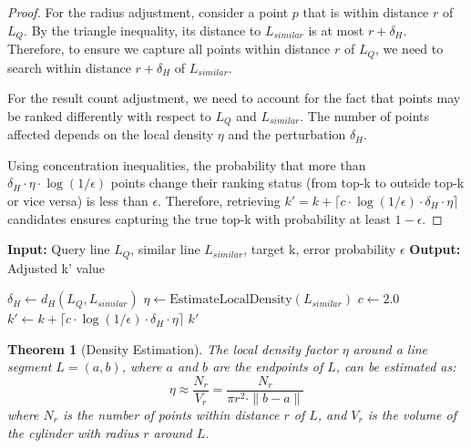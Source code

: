 \documentclass[numbers,sort]{article}
\newtheorem{theorem}{Theorem}
\begin{document}
\begin{proof}
For the radius adjustment, consider a point $p$ that is within distance $r$ of $L_Q$. By the triangle inequality, its distance to $L_{similar}$ is at most $r + \delta_H$. Therefore, to ensure we capture all points within distance $r$ of $L_Q$, we need to search within distance $r + \delta_H$ of $L_{similar}$.

For the result count adjustment, we need to account for the fact that points may be ranked differently with respect to $L_Q$ and $L_{similar}$. The number of points affected depends on the local density $\eta$ and the perturbation $\delta_H$.

Using concentration inequalities, the probability that more than $\delta_H \cdot \eta \cdot \log(1/\epsilon)$ points change their ranking status (from top-k to outside top-k or vice versa) is less than $\epsilon$. Therefore, retrieving $k' = k + \lceil c \cdot \log(1/\epsilon) \cdot \delta_H \cdot \eta \rceil$ candidates ensures capturing the true top-k with probability at least $1-\epsilon$.
\end{proof}

\begin{algorithm}[h]
\caption{Adaptive k' Selection}
\label{alg:adaptive-k}
\begin{algorithmic}[1]
\STATE \textbf{Input:} Query line $L_Q$, similar line $L_{similar}$, target k, error probability $\epsilon$
\STATE \textbf{Output:} Adjusted k' value

\STATE $\delta_H \leftarrow d_H(L_Q, L_{similar})$ 
\STATE $\eta \leftarrow \text{EstimateLocalDensity}(L_{similar})$ 
\STATE $c \leftarrow 2.0$ 
\STATE $k' \leftarrow k + \lceil c \cdot \log(1/\epsilon) \cdot \delta_H \cdot \eta \rceil$
\RETURN $k'$
\end{algorithmic}
\end{algorithm}

\begin{theorem}[Density Estimation]
\label{thm:density-estimation}
The local density factor $\eta$ around a line segment $L = (a, b)$, where $a$ and $b$ are the endpoints of $L$, can be estimated as:
\begin{equation}
\eta \approx \frac{N_r}{V_r} = \frac{N_r}{\pi r^2 \cdot \|b-a\|}
\end{equation}
where $N_r$ is the number of points within distance $r$ of $L$, and $V_r$ is the volume of the cylinder with radius $r$ around $L$.
\end{theorem}
\end{document}
